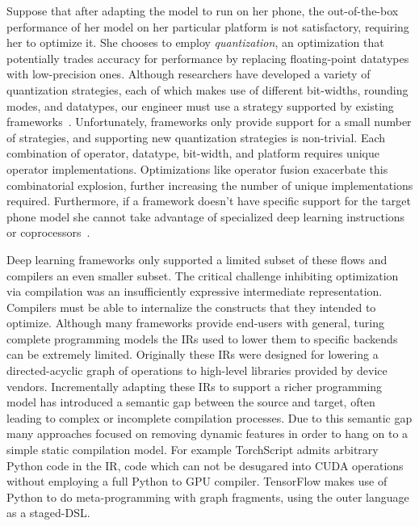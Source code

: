 Suppose that after adapting the model to run on her phone,
  the out-of-the-box performance of her
  model on her particular platform is not satisfactory, requiring her to optimize it.
She chooses to employ \textit{quantization}, an optimization that
  potentially trades accuracy for performance by replacing
  floating-point datatypes with low-precision ones.
Although researchers have developed a variety of quantization
  strategies, each of which makes use of different bit-widths, rounding
  modes, and datatypes, our engineer must use a strategy supported
  by existing frameworks~\citep{gustafson2015end, tf_lite_ops_compat, glow_quant}.
Unfortunately, frameworks only provide support for a small number
  of strategies, and supporting new quantization strategies is non-trivial.
Each combination of operator, datatype, bit-width, and
  platform requires unique operator implementations.
Optimizations like operator fusion exacerbate this combinatorial explosion,
  further increasing the number of unique implementations required.
Furthermore, if a framework doesn't have specific support for
  the target phone model she cannot take advantage of specialized deep learning
  instructions or coprocessors~\citep{apple_neural_engine}.

Deep learning frameworks only supported a limited subset of these flows
  and compilers an even smaller subset.
The critical challenge inhibiting optimization via compilation
  was an insufficiently expressive intermediate representation.
Compilers must be able to internalize the constructs
  that they intended to optimize.
Although many frameworks provide end-users with general, turing
  complete programming models the IRs used to lower them to specific
  backends can be extremely limited.
Originally these IRs were designed for lowering a directed-acyclic
  graph of operations to high-level libraries provided by device vendors.
Incrementally adapting these IRs to support a richer programming
  model has introduced a semantic gap between the source and target, often
  leading to complex or incomplete compilation processes.
Due to this semantic gap many approaches focused on removing dynamic features in
  order to hang on to a simple static compilation model.
For example TorchScript admits arbitrary Python code in the IR,
  code which can not be desugared into CUDA operations without employing
  a full Python to GPU compiler.
TensorFlow makes use of Python to do meta-programming with graph fragments,
  using the outer language as a staged-DSL.

